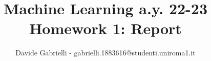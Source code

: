 \documentclass{article}
\title{Machine Learning a.y. 22-23\\ \textbf{Homework 1: Report}}
\author{
Davide Gabrielli - gabrielli.1883616@studenti.uniroma1.it
}
\begin{document}
\maketitle

\sloppy


%
\end{document}
